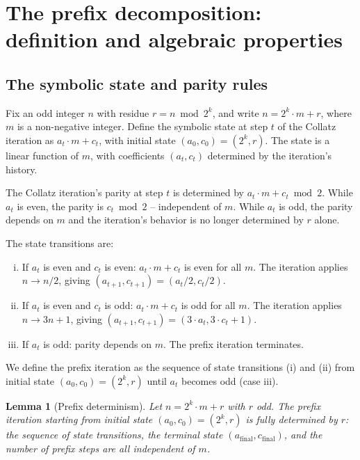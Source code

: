 \documentclass{article}
\newtheorem{lemma}[theorem]{Lemma}
\theoremstyle{plain}
\begin{document}
\section{The prefix decomposition: definition and algebraic properties}
\subsection{The symbolic state and parity rules}
Fix an odd integer $n$ with residue $r = n \bmod 2^k$, and write $n = 2^k \cdot m + r$, where $m$ is a non-negative integer. Define the symbolic state at step $t$ of the Collatz iteration as $a_t \cdot m + c_t$, with initial state $(a_0, c_0) = (2^k, r)$. The state is a linear function of $m$, with coefficients $(a_t, c_t)$ determined by the iteration's history.

The Collatz iteration's parity at step $t$ is determined by $a_t \cdot m + c_t \bmod 2$. While $a_t$ is even, the parity is $c_t \bmod 2$ -- independent of $m$. While $a_t$ is odd, the parity depends on $m$ and the iteration's behavior is no longer determined by $r$ alone.

The state transitions are:
\begin{enumerate}[(i)]
    \item If $a_t$ is even and $c_t$ is even: $a_t \cdot m + c_t$ is even for all $m$. The iteration applies $n \rightarrow n/2$, giving $(a_{t+1}, c_{t+1}) = (a_t/2, c_t/ 2)$.
    \item If $a_t$ is even and $c_t$ is odd: $a_t \cdot m + c_t$ is odd for all $m$. The iteration applies $n \rightarrow 3n+1$, giving $(a_{t+1}, c_{t+1}) = (3 \cdot a_t, 3 \cdot c_t + 1)$.
    \item If $a_t$ is odd: parity depends on $m$. The prefix iteration terminates.
\end{enumerate}

We define the prefix iteration as the sequence of state transitions (i) and (ii) from initial state $(a_0, c_0) = (2^k, r)$ until $a_t$ becomes odd (case iii).

\begin{lemma}[Prefix determinism]
\label{lem:prefix-determinism}
Let $n=2^k \cdot m + r$ with $r$ odd. The prefix iteration starting from initial state $(a_0, c_0) = (2^k, r)$ is fully determined by $r$: the sequence of state transitions, the terminal state $(a_{\text{final}}, c_{\text{final}})$, and the number of prefix steps are all independent of $m$.
\end{lemma}
\end{document}
